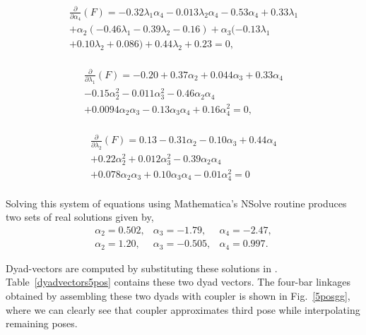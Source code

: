 \begin{equation}
\begin{array}{c}
\frac{\partial}{\partial \alpha_4}(F) = -0.32 {\lambda_1} {\alpha_4}-0.013 {\lambda_2} {\alpha_4}-0.53 {\alpha_4}+0.33 {\lambda_1}\\+{\alpha_2} (-0.46 {\lambda_1}-0.39 {\lambda_2}-0.16)+{\alpha_3} (-0.13 {\lambda_1}\\+0.10 {\lambda_2}+0.086)+0.44 {\lambda_2}+0.23 = 0,  \\
\end{array}
\end{equation}

\begin{equation}
\begin{array}{c}
 \frac{\partial}{\partial \lambda_1}(F) = -0.20 +0.37 \alpha _2+0.044 \alpha _3+0.33 \alpha _4 \\-0.15 \alpha _2^2-0.011 \alpha _3^2-0.46 \alpha _2  \alpha _4 \\+0.0094 \alpha _2 \alpha _3-0.13 \alpha _3 \alpha _4+0.16 \alpha _4^2= 0,  \\
 \end{array}
\end{equation}

 \begin{equation}
\begin{array}{c}
 \frac{\partial}{\partial \lambda_2}(F) = 0.13-0.31 \alpha _2-0.10 \alpha _3 +0.44 \alpha _4  \\+0.22 \alpha _2^2+0.012 \alpha _3^2-0.39 \alpha _2 \alpha _4  \\+0.078 \alpha _2 \alpha _3+0.10 \alpha _3 \alpha _4-0.01 \alpha _4^2 = 0
\end{array}
\end{equation}
\\
[0.25cm]
Solving this system of equations using Mathematica's NSolve routine produces two sets of real solutions given by,
\begin{equation}
\begin{array}{llll}
\alpha_2 = 0.502 ,& \alpha_3 = -1.79,& \alpha_4 = -2.47, \\
\alpha_2 = 1.20 ,& \alpha_3 = -0.505,& \alpha_4 = 0.997.
\end{array}
\end{equation}

Dyad-vectors are computed by substituting these solutions in . Table~\ref{dyadvectors5pos} contains these two dyad vectors. The four-bar linkages obtained by assembling these two dyads with coupler is shown in Fig.~\ref{5posgg}, where we can clearly see that coupler approximates third pose while interpolating remaining poses.

